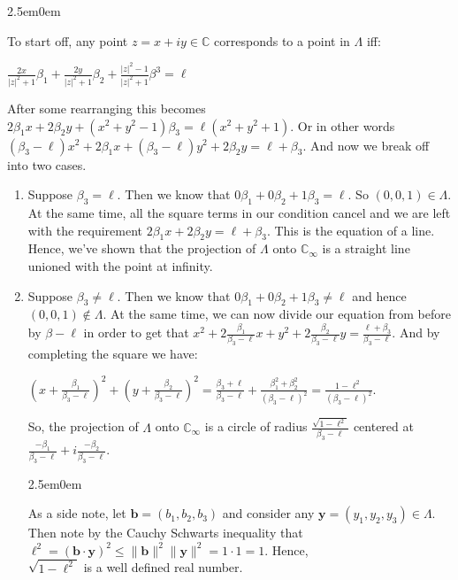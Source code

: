\documentclass{book}
\newcommand{\HexOne}{%
   \color{Purple}%
   \fontsize{12}{13}\selectfont%
}
\newcommand{\HexPPP}{%
   \color{VioletRed}%
   \fontsize{11}{12}\selectfont%
}
\newenvironment{myIndent}{%
   \begin{adjustwidth}{2.5em}{0em}%
}{%
   \end{adjustwidth}%
}
\newcommand{\retTwo}{\hfill\bigbreak}
\begin{document}
\begin{myIndent}\HexOne
	To start off, any point $z = x + iy \in \mathbb{C}$ corresponds to a point in $\Lambda$ iff:

	{\centering $\frac{2x}{|z|^2 + 1}\beta_1 + \frac{2y}{|z|^2 + 1}\beta_2 + \frac{|z|^2 - 1}{|z|^2 + 1}\beta^3 = \ell$ \retTwo\par}

	After some rearranging this becomes $2\beta_1 x + 2\beta_2 y + (x^2 + y^2 - 1)\beta_3 = \ell(x^2 + y^2 + 1)$. Or in other words $(\beta_3 - \ell)x^2 + 2\beta_1 x + (\beta_3 - \ell)y^2 + 2\beta_2 y = \ell + \beta_3$. And now we break off into two cases.

	\begin{enumerate}
		\item Suppose $\beta_3 = \ell$. Then we know that $0\beta_1 + 0\beta_2 + 1\beta_3 = \ell$. So $(0, 0, 1) \in \Lambda$. At the same time, all the square terms in our condition cancel and we are left with the requirement $2\beta_1 x + 2\beta_2 y = \ell + \beta_3$. This is the equation of a line. Hence, we've shown that the projection of $\Lambda$ onto $\mathbb{C}_\infty$ is a straight line unioned with the point at infinity.\retTwo
		
		\item Suppose $\beta_3 \neq \ell$. Then we know that $0\beta_1 + 0\beta_2 + 1\beta_3 \neq \ell$ and hence $(0, 0, 1) \notin \Lambda$. At the same time, we can now divide our equation from before by $\beta - \ell$ in order to get that $x^2 + 2\frac{\beta_1}{\beta_3 - \ell}x + y^2 + 2\frac{\beta_2}{\beta_3 - \ell}y = \frac{\ell + \beta_3}{\beta_3 - \ell}$. And by completing the square we have:
		
		{\centering $(x + \frac{\beta_1}{\beta_3 - \ell})^2 + (y + \frac{\beta_2}{\beta_3 - \ell})^2 = \frac{\beta_3 + \ell}{\beta_3 - \ell} + \frac{\beta_1^2 + \beta_2^2}{(\beta_3 - \ell)^2} = \frac{1 - \ell^2}{(\beta_3 - \ell)^2}$.\retTwo\par}

		So, the projection of $\Lambda$ onto $\mathbb{C}_\infty$ is a circle of radius $\frac{\sqrt{1 - \ell^2}}{\beta_3 - \ell}$ centered at $\frac{-\beta_1}{\beta_3 - \ell} + i\frac{-\beta_2}{\beta_3 - \ell}$.

		\begin{myIndent}\HexPPP
			As a side note, let $\mathbf{b} = (b_1, b_2, b_3)$ and consider any $\mathbf{y} = (y_1, y_2, y_3) \in \Lambda$. Then note by the Cauchy Schwarts inequality that $\ell^2 = (\mathbf{b} \cdot \mathbf{y})^2 \leq \|\mathbf{b}\|^2 \|\mathbf{y}\|^2 = 1 \cdot 1 = 1$. Hence,\\ $\sqrt{1 - \ell^2}$ is a well defined real number.\retTwo
		\end{myIndent}
	\end{enumerate}
\end{myIndent}
\end{document}

